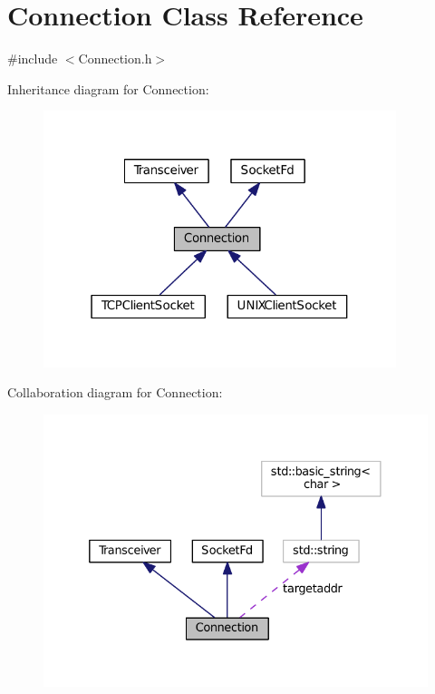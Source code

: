 \hypertarget{classConnection}{\section{Connection Class Reference}
\label{classConnection}
}


{\ttfamily \#include $<$Connection.\+h$>$}



Inheritance diagram for Connection\+:
\nopagebreak
\begin{figure}[H]
\begin{center}
\leavevmode
\includegraphics[width=292pt]{classConnection__inherit__graph}
\end{center}
\end{figure}


Collaboration diagram for Connection\+:
\nopagebreak
\begin{figure}[H]
\begin{center}
\leavevmode
\includegraphics[width=332pt]{classConnection__coll__graph}
\end{center}
\end{figure}
